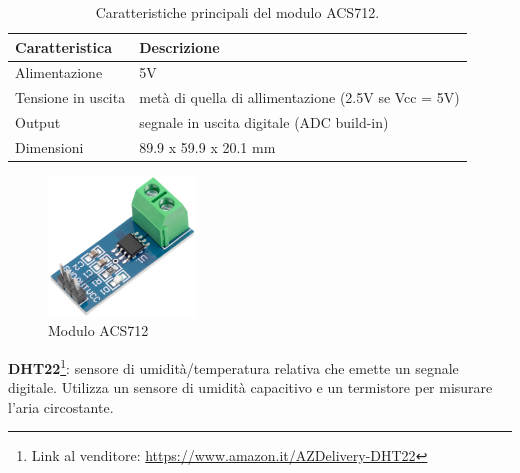 \begin{table}[H]
    \centering
    \begin{tabular}{|l|l|}
    \hline
    \textbf{Caratteristica} & \textbf{Descrizione}                                \\ \hline
    Alimentazione           & 5V                                                  \\ \hline
    Tensione in uscita      & metà di quella di allimentazione (2.5V se Vcc = 5V) \\ \hline
    Output                  & segnale in uscita digitale (ADC build-in)           \\ \hline
    Dimensioni              & 89.9 x 59.9 x 20.1 mm                               \\ \hline
    \end{tabular}
    \caption{\label{acs712-features}Caratteristiche principali del modulo ACS712.}
\end{table}

\begin{figure}[H]
    \begin{center}
      \includegraphics[width=0.35\textwidth]{images/sensors/acs712.png}
    \end{center}
    \caption{Modulo ACS712}
\end{figure}

\textbf{DHT22}\footnote{Link al venditore: \href{https://www.amazon.it/AZDelivery-temperatura-circuito-Raspberry-gratuito/dp/B078SVZB1X/ref=sr_1_6?keywords=dht22&qid=1673890614&sr=8-6&th=1}{https://www.amazon.it/AZDelivery-DHT22}}: sensore di umidità/temperatura relativa che emette un segnale digitale. Utilizza un sensore di umidità capacitivo e un termistore per misurare l'aria circostante. 

